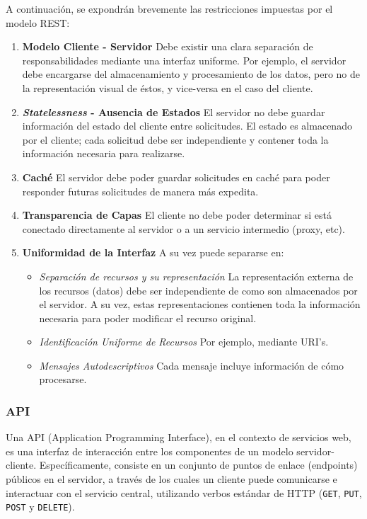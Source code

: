 \documentclass[11pt,letterpaper]{article}
\begin{document}
A continuación, se expondrán brevemente las restricciones impuestas por el modelo REST:
\begin{enumerate}
    \item \textbf{Modelo Cliente - Servidor} \@ Debe existir una clara separación de responsabilidades mediante una interfaz uniforme. Por ejemplo, el servidor debe encargarse del almacenamiento y procesamiento de los datos, pero no de la representación visual de éstos, y vice-versa en el caso del cliente.
    \item \textbf{\textit{Statelessness} - Ausencia de Estados} \@ El servidor no debe guardar información del estado del cliente entre solicitudes. El estado es almacenado por el cliente; cada solicitud debe ser independiente y contener toda la información necesaria para realizarse.
    \item \textbf{Caché} \@ El servidor debe poder guardar solicitudes en caché para poder responder futuras solicitudes de manera más expedita.
    \item \textbf{Transparencia de Capas} \@ El cliente no debe poder determinar si está conectado directamente al servidor o a un servicio intermedio (proxy, etc).
    \item \textbf{Uniformidad de la Interfaz} \@ A su vez puede separarse en:
    \begin{itemize}
        \item \emph{Separación de recursos y su representación} \@ La representación externa de los recursos (datos) debe ser independiente de como son almacenados por el servidor. A su vez, estas representaciones contienen toda la información necesaria para poder modificar el recurso original.
        \item \emph{Identificación Uniforme de Recursos} \@ Por ejemplo, mediante URI's\cite{uri}.
        \item \emph{Mensajes Autodescriptivos} \@ Cada mensaje incluye información de cómo procesarse.
    \end{itemize}
\end{enumerate}

\subsubsection{API}

Una API (Application Programming Interface), en el contexto de servicios web, es una interfaz de interacción entre los componentes de un modelo servidor-cliente. Específicamente, consiste en un conjunto de puntos de enlace (endpoints) públicos en el servidor, a través de los cuales un cliente puede comunicarse e interactuar con el servicio central, utilizando verbos estándar de HTTP (\texttt{GET}, \texttt{PUT}, \texttt{POST} y \texttt{DELETE}).
\end{document}
